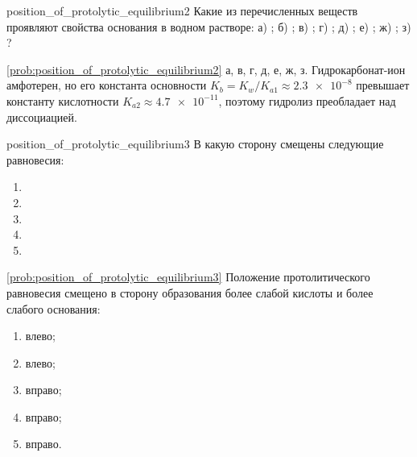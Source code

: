 \begin{problem}{}{position_of_protolytic_equilibrium2}
    Какие из перечисленных веществ проявляют свойства основания в водном растворе: а) ; б) ; в) ; г) ; д) ; е) ; ж) ; з) ?
    \begin{sol}{\ref{prob:position_of_protolytic_equilibrium2}}
        а, в, г, д, е, ж, з. Гидрокарбонат-ион амфотерен, но его константа основности $K_b = K_w/K_{a1} \approx \num{2,3e-8}$ превышает константу кислотности $K_{a2} \approx \num{4,7e-11}$, поэтому гидролиз преобладает над диссоциацией.
    \end{sol}
\end{problem}

\begin{problem}{}{position_of_protolytic_equilibrium3}
    В какую сторону смещены следующие равновесия:
    \begin{enumerate}[label=\arabic*)]
        \item {}
        \item {}
        \item {}
        \item {}
        \item {}
    \end{enumerate}
    \begin{sol}{\ref{prob:position_of_protolytic_equilibrium3}}
        Положение протолитического равновесия смещено в сторону образования более слабой кислоты и более слабого основания:
        \begin{enumerate}[label=\arabic*)]
            \item влево;
            \item влево;
            \item вправо;
            \item вправо;
            \item вправо.
        \end{enumerate}
    \end{sol}
\end{problem}

